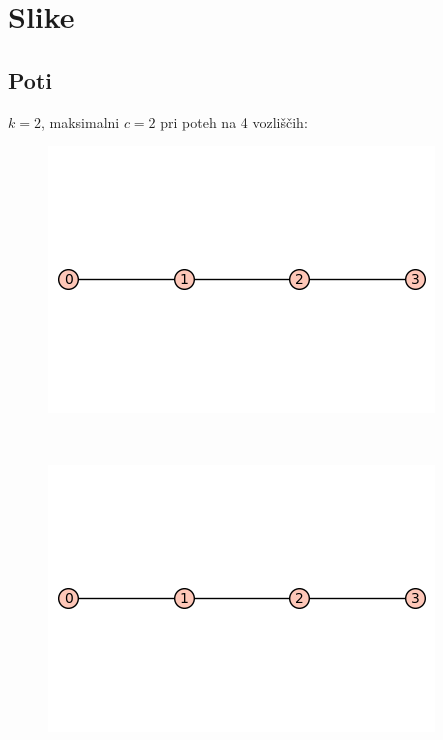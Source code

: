 \documentclass[12pt, a4paper]{article}
\begin{document}
\section{Slike}

\subsection{Poti}

$k=2$, maksimalni $c=2$ pri poteh na 4 vozliščih:\\

\begin{figure}[h!]
\centering
\includegraphics[width=\linewidth]{4-pot}
\end{figure} \\

\begin{figure}[h!]
\centering
\includegraphics[width=\linewidth]{4-pot}
\end{figure} \\
\end{document}
